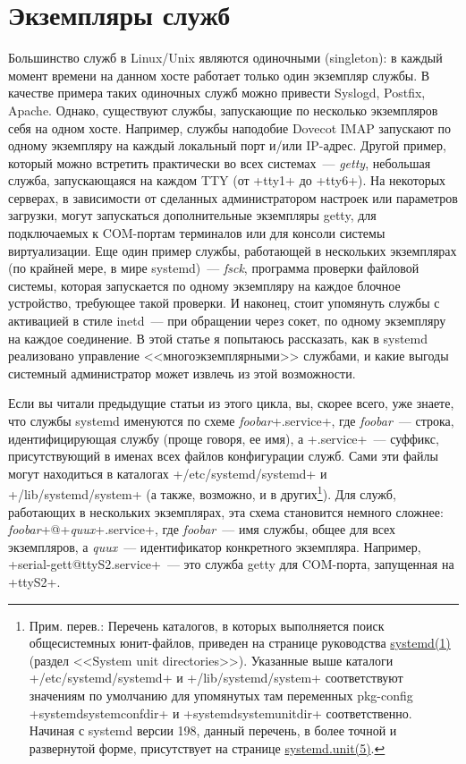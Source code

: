 \documentclass[10pt,oneside,a4paper]{article}
\begin{document}
\section{Экземпляры служб}
\label{sec:instances}

Большинство служб в Linux/Unix являются одиночными (singleton): в каждый момент
времени на данном хосте работает только один экземпляр службы. В качестве
примера таких одиночных служб можно привести Syslogd, Postfix, Apache. Однако,
существуют службы, запускающие по несколько экземпляров себя на одном хосте.
Например, службы наподобие Dovecot IMAP запускают по одному экземпляру на каждый
локальный порт и/или IP-адрес. Другой пример, который можно встретить
практически во всех системах~--- \emph{getty}, небольшая служба, запускающаяся на
каждом TTY (от +tty1+ до +tty6+). На некоторых серверах, в зависимости от
сделанных администратором настроек или параметров загрузки, могут запускаться
дополнительные экземпляры getty, для подключаемых к COM-портам терминалов или
для консоли системы виртуализации. Еще один пример службы, работающей в
нескольких экземплярах (по крайней мере, в мире systemd)~--- \emph{fsck},
программа проверки файловой системы, которая запускается по одному экземпляру
на каждое блочное устройство, требующее такой проверки. И наконец, стоит
упомянуть службы с активацией в стиле inetd~--- при обращении через сокет, по
одному экземпляру на каждое соединение. В этой статье я попытаюсь рассказать,
как в systemd реализовано управление <<многоэкземплярными>> службами, и какие
выгоды системный администратор может извлечь из этой возможности.

Если вы читали предыдущие статьи из этого цикла, вы, скорее всего, уже знаете,
что службы systemd именуются по схеме \emph{foobar}+.service+, где
\emph{foobar}~--- строка, идентифицирующая службу (проще говоря, ее имя), а
+.service+~--- суффикс, присутствующий в именах всех файлов конфигурации служб.
Сами эти файлы могут находиться в каталогах +/etc/systemd/systemd+ и
+/lib/systemd/system+ (а также, возможно, и в других\footnote{Прим. перев.:
Перечень каталогов, в которых выполняется поиск общесистемных юнит-файлов,
приведен на странице руководства 
\href{http://www.freedesktop.org/software/systemd/man/systemd.html}{systemd(1)}
(раздел <<System unit directories>>). Указанные выше каталоги
+/etc/systemd/systemd+ и +/lib/systemd/system+ соответствуют значениям по
умолчанию для упомянутых там переменных pkg-config +systemdsystemconfdir+ и
+systemdsystemunitdir+ соответственно. Начиная с systemd версии 198, данный
перечень, в более точной и развернутой форме, присутствует на странице
\href{http://www.freedesktop.org/software/systemd/man/systemd.unit.html}%
{systemd.unit(5)}.}). Для служб, работающих в нескольких экземплярах, эта схема
становится немного сложнее: \emph{foobar}+@+\emph{quux}+.service+, где
\emph{foobar}~--- имя службы, общее для всех экземпляров, а \emph{quux}~---
идентификатор конкретного экземпляра.  Например, +serial-gett@ttyS2.service+~---
это служба getty для COM-порта, запущенная на +ttyS2+.
\end{document}
